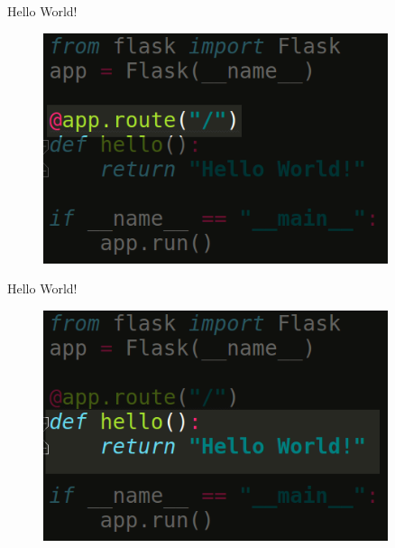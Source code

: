 \documentclass{beamer}
\begin{document}
\begin{frame}{Hello World!}

\begin{figure}[h]
\includegraphics[width=0.9\textwidth]{flask2}
\end{figure}

\end{frame}
\begin{frame}{Hello World!}

\begin{figure}[h]
\includegraphics[width=0.9\textwidth]{flask3}
\end{figure}

\end{frame}
\end{document}

